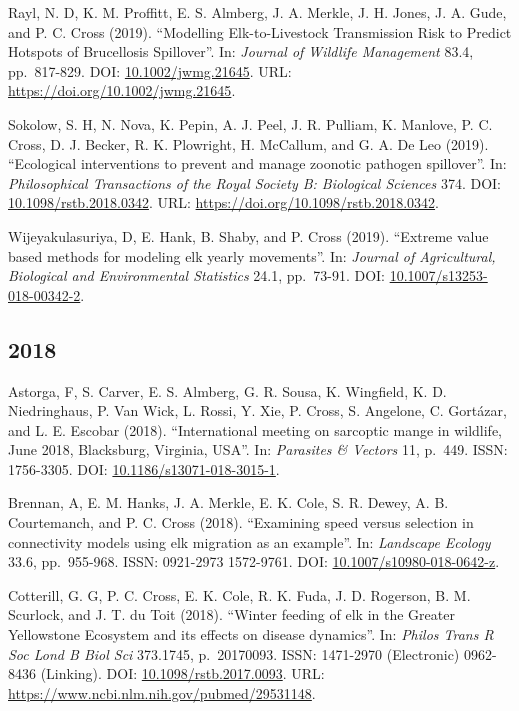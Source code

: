 \documentclass[12pt,]{article}
\begin{document}
Rayl, N. D, K. M. Proffitt, E. S. Almberg, J. A. Merkle, J. H. Jones, J.
A. Gude, and P. C. Cross (2019). ``Modelling Elk-to-Livestock
Transmission Risk to Predict Hotspots of Brucellosis Spillover''. In:
\emph{Journal of Wildlife Management} 83.4, pp.~817-829. DOI:
\href{https://doi.org/10.1002\%2Fjwmg.21645}{10.1002/jwmg.21645}. URL:
\url{https://doi.org/10.1002/jwmg.21645}.

Sokolow, S. H, N. Nova, K. Pepin, A. J. Peel, J. R. Pulliam, K. Manlove,
P. C. Cross, D. J. Becker, R. K. Plowright, H. McCallum, and G. A. De
Leo (2019). ``Ecological interventions to prevent and manage zoonotic
pathogen spillover''. In: \emph{Philosophical Transactions of the Royal
Society B: Biological Sciences} 374. DOI:
\href{https://doi.org/10.1098\%2Frstb.2018.0342}{10.1098/rstb.2018.0342}.
URL: \url{https://doi.org/10.1098/rstb.2018.0342}.

Wijeyakulasuriya, D, E. Hank, B. Shaby, and P. Cross (2019). ``Extreme
value based methods for modeling elk yearly movements''. In:
\emph{Journal of Agricultural, Biological and Environmental Statistics}
24.1, pp.~73-91. DOI:
\href{https://doi.org/10.1007\%2Fs13253-018-00342-2}{10.1007/s13253-018-00342-2}.

\hypertarget{section-1}{%
\subsection{2018}\label{section-1}}

Astorga, F, S. Carver, E. S. Almberg, G. R. Sousa, K. Wingfield, K. D.
Niedringhaus, P. Van Wick, L. Rossi, Y. Xie, P. Cross, S. Angelone, C.
Gortázar, and L. E. Escobar (2018). ``International meeting on sarcoptic
mange in wildlife, June 2018, Blacksburg, Virginia, USA''. In:
\emph{Parasites \& Vectors} 11, p.~449. ISSN: 1756-3305. DOI:
\href{https://doi.org/10.1186\%2Fs13071-018-3015-1}{10.1186/s13071-018-3015-1}.

Brennan, A, E. M. Hanks, J. A. Merkle, E. K. Cole, S. R. Dewey, A. B.
Courtemanch, and P. C. Cross (2018). ``Examining speed versus selection
in connectivity models using elk migration as an example''. In:
\emph{Landscape Ecology} 33.6, pp.~955-968. ISSN: 0921-2973 1572-9761.
DOI:
\href{https://doi.org/10.1007\%2Fs10980-018-0642-z}{10.1007/s10980-018-0642-z}.

Cotterill, G. G, P. C. Cross, E. K. Cole, R. K. Fuda, J. D. Rogerson, B.
M. Scurlock, and J. T. du Toit (2018). ``Winter feeding of elk in the
Greater Yellowstone Ecosystem and its effects on disease dynamics''. In:
\emph{Philos Trans R Soc Lond B Biol Sci} 373.1745, p.~20170093. ISSN:
1471-2970 (Electronic) 0962-8436 (Linking). DOI:
\href{https://doi.org/10.1098\%2Frstb.2017.0093}{10.1098/rstb.2017.0093}.
URL: \url{https://www.ncbi.nlm.nih.gov/pubmed/29531148}.
\end{document}
